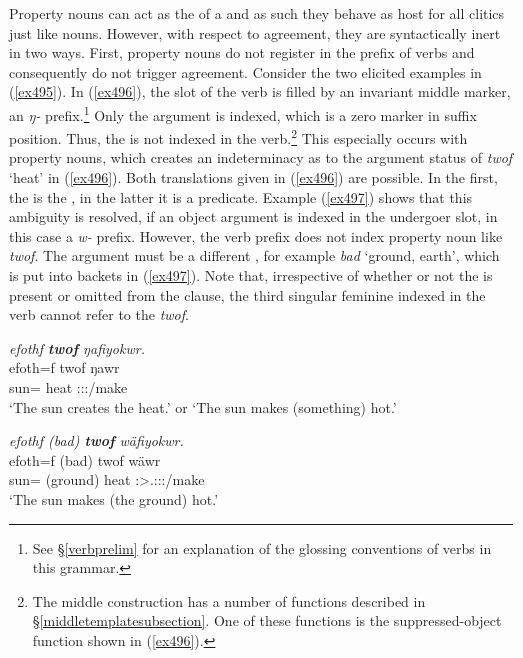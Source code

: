 Property nouns can act as the  of a  and as such they behave as host for all  clitics just like nouns. However, with respect to agreement, they are syntactically inert in two ways. First, property nouns do not register in the  prefix of verbs and consequently do not trigger  agreement. Consider the two elicited examples in (\ref{ex495}). In (\ref{ex496}), the  slot of the verb is filled by an invariant middle marker, an \emph{ŋ-} prefix.\footnote{See \S\ref{verbprelim} for an explanation of the glossing conventions of verbs in this grammar.} Only the  argument is indexed, which is a zero marker in suffix position. Thus, the  is not indexed in the verb.\footnote{The middle construction has a number of functions described in {\S}\ref{middletemplatesubsection}. One of these functions is the suppressed-object function shown in (\ref{ex496}).} This especially occurs with property nouns, which creates an indeterminacy as to the argument status of \emph{twof} `heat' in (\ref{ex496}). Both translations given in (\ref{ex496}) are possible. In the first, the  is the , in the latter it is a  predicate. Example (\ref{ex497}) shows that this ambiguity is resolved, if an object argument is indexed in the undergoer slot, in this case a \emph{w-} prefix. However, the verb prefix does not index property noun like \emph{twof}. The  argument must be a different , for example \emph{bad} `ground, earth', which is put into backets in (\ref{ex497}). Note that, irrespective of whether or not the   is present or omitted from the clause, the third singular feminine indexed in the verb cannot refer to the  \emph{twof}.

\begin{exe}
	\ex \label{ex495}
	\begin{xlist}
	\ex \emph{efothf \textbf{twof} ŋafiyokwr.}\\
	\gll efoth=f twof ŋawr\\
	sun={\Erg} heat \Stsg:\Sbj:\Nonpast:\Ipfv/make\\
	\trans `The sun creates the heat.' or `The sun makes (something) hot.'
	\label{ex496}
	
	\newpage
	\ex \emph{efothf (bad) \textbf{twof} wäfiyokwr.}\\
	\gll efoth=f (bad) twof wäwr\\
	sun={\Erg} (ground) heat \Stsg:\Sbj>\Tsg.\F:\Obj:\Nonpast:\Ipfv/make\\
	\trans `The sun makes (the ground) hot.'
	\label{ex497}
	\end{xlist}
\end{exe}

